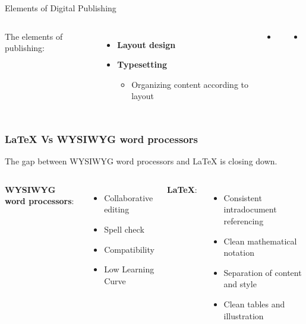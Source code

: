 \documentclass{beamer}
\begin{document}
\begin{frame}{Elements of Digital Publishing}
 \begin{columns}
  The elements of publishing:
  \begin{itemize}
   \item {\color{blue}\textbf{Layout design}}
   \item {\color{red}\textbf{Typesetting}}
   \begin{itemize}
     \item {\color{red}Organizing content according to layout}
   \end{itemize}
   \end{itemize}
   \begin{itemize}
   \item {\color{blue}{\Large \LaTeX}}
   \end{itemize}
   \vspace{2.5cm}
   \begin{itemize}
   \item {\color{red}{\Large \TeX}}
   \end{itemize}
 \end{columns}
\end{frame}


\begin{frame}
\frametitle{\LaTeX{} Vs WYSIWYG word processors}

The gap between WYSIWYG word processors and \LaTeX{} is closing down. 
\vspace{1cm}
\pause
\begin{columns}[t]
\textbf{WYSIWYG word processors}:
\begin{itemize}
 \item Collaborative editing
 \item Spell check
 \item Compatibility
 \item Low Learning Curve
\end{itemize}
\pause
{}
\textbf{\LaTeX{}}:
\begin{itemize}
  \item Consistent intradocument referencing 
  \item Clean mathematical notation
  \item Separation of content and style
  \item Clean tables and illustration
\end{itemize}
\end{columns}
\end{frame}
\end{document}
